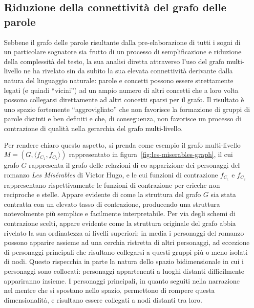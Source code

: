 \subsection{Riduzione della connettività del grafo delle parole}\label{subsec:elaborazione-del-grafo-delle-parole}

Sebbene il grafo delle parole risultante dalla pre-elaborazione di tutti i sogni di un particolare sognatore
sia frutto di un processo di semplificazione e riduzione della complessità del testo, la sua analisi diretta
attraverso l'uso del grafo multi-livello ne ha rivelato sin da subito la sua elevata connettività derivante dalla
natura del linguaggio naturale: parole e concetti possono essere strettamente legati (e quindi ``vicini'') ad un
ampio numero di altri concetti che a loro volta possono collegarsi direttamente ad altri concetti sparsi per il grafo.
Il risultato è uno spazio fortemente ``aggrovigliato'' che non favorisce la formazione di gruppi di parole distinti e
ben definiti e che, di conseguenza, non favorisce un processo di contrazione di qualità nella
gerarchia del grafo multi-livello.

Per rendere chiaro questo aspetto, si prenda come esempio il grafo multi-livello $M = (G, \langle f_{C_1}, f_{C_2}\rangle)$
rappresentato in figura~\ref{fig:les-miserables-graph}, il cui grafo $G$ rappresenta il grafo delle relazioni di
co-apparizione dei personaggi del romanzo \textit{Les Misérables} di Victor Hugo,
e le cui funzioni di contrazione $f_{C_1}$ e $f_{C_2}$ rappresentano rispettivamente le funzioni di contrazione
per cricche non reciproche e stelle.
Appare evidente di come la struttura del grafo $G$ sia stata contratta con un elevato tasso di contrazione,
producendo una struttura notevolmente più semplice e facilmente interpretabile. Per via degli schemi di
contrazione scelti, appare evidente come la struttura originale del grafo abbia rivelato la sua ordinatezza ai livelli
superiori: in media i personaggi del romanzo possono apparire assieme ad una cerchia ristretta di altri personaggi,
ad eccezione di personaggi principali che risultano collegarsi a questi gruppi più o meno isolati di nodi.
Questo rispecchia in parte la natura dello spazio bidimensionale in cui i personaggi sono collocati: personaggi
appartenenti a luoghi distanti difficilmente appariranno insieme. I personaggi principali, in quanto seguiti
nella narrazione nel mentre che si spostano nello spazio, permettono di rompere questa dimensionalità, e risultano
essere collegati a nodi distanti tra loro.

